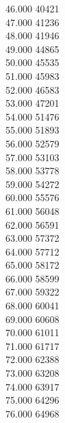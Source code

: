 { 46.000	40421 \\
 47.000	41236 \\
 48.000	41946 \\
 49.000	44865 \\
 50.000	45535 \\
 51.000	45983 \\
 52.000	46583 \\
 53.000	47201 \\
 54.000	51476 \\
 55.000	51893 \\
 56.000	52579 \\
 57.000	53103 \\
 58.000	53778 \\
 59.000	54272 \\
 60.000	55576 \\
 61.000	56048 \\
 62.000	56591 \\
 63.000	57372 \\
 64.000	57712 \\
 65.000	58172 \\
 66.000	58599 \\
 67.000	59322 \\
 68.000	60041 \\
 69.000	60608 \\
 70.000	61011 \\
 71.000	61717 \\
 72.000	62388 \\
 73.000	63208 \\
 74.000	63917 \\
 75.000	64296 \\
 76.000	64968 \\
}
